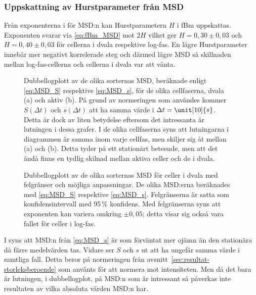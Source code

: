 \subsubsection{Uppskattning av Hurstparameter från MSD}

Från exponenterna i  för MSD:n kan Hurstparametern $H$ i fBm uppskattas. Exponenten svarar via \eqref{eq:fBm_MSD} mot $2H$ vilket ger $H=0,30\pm0,03$ och $H=0,40\pm0,03$ för cellerna i dvala respektive log-fas. En lägre Hurstparameter innebär mer negativt korrelerade steg och därmed lägre MSD så skillnaden mellan log-fas-cellerna och cellerna i dvala var att vänta.

\begin{figure}\centerline{
\subfigure[][]{}
\subfigure[][]{}
}
\caption{Dubbellogplott av de olika sorternas MSD, beräknade enligt \eqref{eq:MSD_S} respektive \eqref{eq:MSD_s}, för de olika cellfaserna, dvala (a) och aktiv (b). På grund av normeringen som användes kommer $S(\Delta{t})$ och $s(\Delta{t})$ att ha samma värde i $\Delta{t}=\unit[10]{s}$. Detta är dock av liten betydelse eftersom det intressanta är lutningen i dessa grafer. I de olika cellfaserna syns att lutningarna i diagrammen är samma inom varje cellfas, men skiljer sig åt mellan (a) och (b). Detta tyder på ett stationärt beteende, men att det ändå finns en tydlig skilnad mellan aktiva celler och de i dvala. %
}
\label{fig:MSD}
\end{figure}
\begin{figure}\centerline{
\subfigure[][]{

}
\subfigure[][]{

}}
\caption{Dubbellogplott av de olika sorternas MSD för celler i dvala med felgränser och möjliga anpassningar. De olika MSD:erna beräknades med \eqref{eq:MSD_S} respektive \eqref{eq:MSD_s}. Felgränserna är satta som konfidensintervall med 95\,\% konfidens. Med felgränserna syns att exponenten kan variera omkring $\pm 0,05$; detta visar sig också vara fallet för celler i log-fas.}
\label{fig:MSD_error}
\end{figure}
\restoregeometry


I  syns att MSD:n från \eqref{eq:MSD_s} är som förväntat mer ojämn än den stationära då färre medelvärden tas. Vidare ser $S$ och $s$ ut att ha ungefär samma värde i samtliga fall. Detta beror på normeringen från avsnitt~\ref{sec:resultat-storleksberoende} som använts för att normera mot intensiteten. Men då det bara är lutningen, i dubbellogplot, på MSD:n som är intressant så påverkas inte resultaten av vilka absoluta värden MSD:n har.


